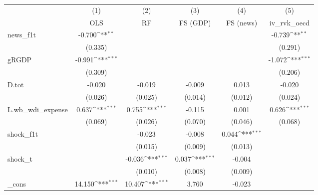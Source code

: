 {
\def\sym#1{\ifmmode^{#1}\else\(^{#1}\)\fi}
\begin{tabular}{l*{5}{c}}
\toprule
            &\multicolumn{1}{c}{(1)}&\multicolumn{1}{c}{(2)}&\multicolumn{1}{c}{(3)}&\multicolumn{1}{c}{(4)}&\multicolumn{1}{c}{(5)}\\
            &\multicolumn{1}{c}{OLS}&\multicolumn{1}{c}{RF}&\multicolumn{1}{c}{FS (GDP)}&\multicolumn{1}{c}{FS (news)}&\multicolumn{1}{c}{iv\_rvk\_oecd}\\
\midrule
news\_f1t    &      -0.700\sym{**} &                     &                     &                     &      -0.739\sym{**} \\
            &     (0.335)         &                     &                     &                     &     (0.291)         \\
\addlinespace
gRGDP       &      -0.991\sym{***}&                     &                     &                     &      -1.072\sym{***}\\
            &     (0.309)         &                     &                     &                     &     (0.206)         \\
\addlinespace
D.tot       &      -0.020         &      -0.019         &      -0.009         &       0.013         &      -0.020         \\
            &     (0.026)         &     (0.025)         &     (0.014)         &     (0.012)         &     (0.024)         \\
\addlinespace
L.wb\_wdi\_expense&       0.637\sym{***}&       0.755\sym{***}&      -0.115         &       0.001         &       0.626\sym{***}\\
            &     (0.069)         &     (0.026)         &     (0.070)         &     (0.046)         &     (0.068)         \\
\addlinespace
shock\_f1t   &                     &      -0.023         &      -0.008         &       0.044\sym{***}&                     \\
            &                     &     (0.015)         &     (0.009)         &     (0.013)         &                     \\
\addlinespace
shock\_t     &                     &      -0.036\sym{***}&       0.037\sym{***}&      -0.004         &                     \\
            &                     &     (0.010)         &     (0.008)         &     (0.009)         &                     \\
\addlinespace
\_cons      &      14.150\sym{***}&      10.407\sym{***}&       3.760         &      -0.023         &                     \\

\end{tabular}}
